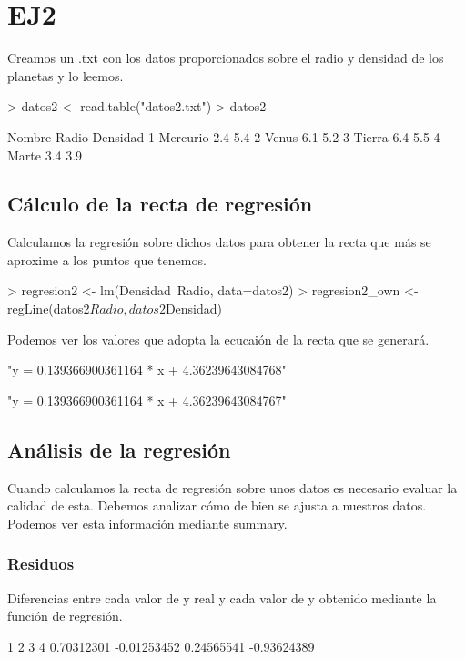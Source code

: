 \documentclass [a4paper] {article}
\begin{document}
\section{EJ2}
Creamos un .txt con los datos proporcionados sobre el radio y densidad de los planetas y lo leemos.
\begin{Schunk}
\begin{Sinput}
> datos2 <- read.table("datos2.txt")
> datos2
\end{Sinput}
\begin{Soutput}
    Nombre Radio Densidad
1 Mercurio   2.4      5.4
2    Venus   6.1      5.2
3   Tierra   6.4      5.5
4    Marte   3.4      3.9
\end{Soutput}
\end{Schunk}

\subsection{Cálculo de la recta de regresión}
Calculamos la regresión sobre dichos datos para obtener la recta que más se aproxime a los puntos que tenemos.
\begin{Schunk}
\begin{Sinput}
> regresion2 <- lm(Densidad~Radio, data=datos2)
> regresion2_own <- regLine(datos2$Radio, datos2$Densidad)
\end{Sinput}
\end{Schunk}

Podemos ver los valores que adopta la ecucaión de la recta que se generará.

\begin{Schunk}
\begin{Soutput}
[1] "y = 0.139366900361164 * x + 4.36239643084768"
\end{Soutput}
\begin{Soutput}
[1] "y = 0.139366900361164 * x + 4.36239643084767"
\end{Soutput}
\end{Schunk}

\subsection{Análisis de la regresión}
Cuando calculamos la recta de regresión sobre unos datos es necesario evaluar la calidad de esta.
Debemos analizar cómo de bien se ajusta a nuestros datos.
Podemos ver esta información mediante summary.

\subsubsection{Residuos}
Diferencias entre cada valor de y real y cada valor de y obtenido mediante la función de regresión.
\begin{Schunk}
\begin{Soutput}
          1           2           3           4 
 0.70312301 -0.01253452  0.24565541 -0.93624389 
\end{Soutput}
\end{Schunk}
\end{document}
